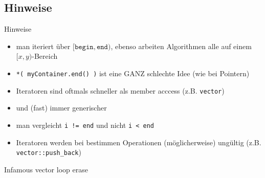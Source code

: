 \subsection{Hinweise}

\begin{frame}[fragile]{Hinweise}
	\begin{itemize}
		\item man iteriert über $[\texttt{begin}, \texttt{end})$, ebenso arbeiten Algorithmen alle auf einem $[x, y)$-Bereich
		\item \texttt{*( myContainer.end() )} ist eine GANZ schlechte Idee (wie bei Pointern)
		\item Iteratoren sind oftmals schneller als member acccess (z.B. \texttt{vector})
		\item und (fast) immer generischer
		\item man vergleicht \texttt{i != end} und nicht \texttt{i < end}
		\item Iteratoren werden bei bestimmen Operationen (möglicherweise) ungültig (z.B. \texttt{vector::push\_back})
	\end{itemize}
\end{frame}

\begin{frame}[t]{Infamous vector loop erase}
	\lstset{morecomment=[l][\invisible]/*\$assign}
	\onslide*<+> {  }
	\lstset{deletecomment=[l]/*\$assign, morecomment=[l][\invisible]/*\$no-assign}
	\onslide*<+> {  }
	
	\onslide*<+> {  }
	
	\onslide*<+> {  }
	
	\lstset{deletecomment=[l][\invisible]/*\$no-assign}
\end{frame}
